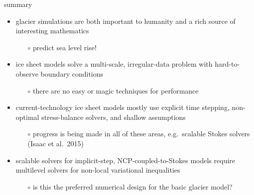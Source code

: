 \documentclass[svgnames,
               hyperref={colorlinks,citecolor=DeepPink4,linkcolor=FireBrick,urlcolor=Maroon},
               usepdftitle=false]  %
               {beamer}
\begin{document}
\begin{frame}{\alert{summary}}

\begin{itemize}
\item glacier simulations are both \alert{important to humanity} and a rich \alert{source of interesting mathematics}
   \begin{itemize}
   \item[$\circ$] predict sea level rise!
   \end{itemize}
\item<2-> ice sheet models solve a multi-scale, irregular-data problem with hard-to-observe boundary conditions
   \begin{itemize}
   \item[$\circ$] there are \alert{no easy or magic techniques} for performance
   \end{itemize}
\item<3-> current-technology ice sheet models mostly use \alert{explicit} time stepping, \alert{non-optimal} stress-balance solvers, and \alert{shallow} assumptions
   \begin{itemize}
   \item[$\circ$] progress is being made in all of these areas, e.g.~scalable Stokes solvers (Isaac et al.~2015)
   \end{itemize}
\item<4> scalable solvers for implicit-step, NCP-coupled-to-Stokes models require \alert{multilevel solvers for non-local variational inequalities}
   \begin{itemize}
   \item[$\circ$] is this the preferred numerical design for the basic glacier model?
   \end{itemize}
\end{itemize}
\end{frame}
\end{document}
